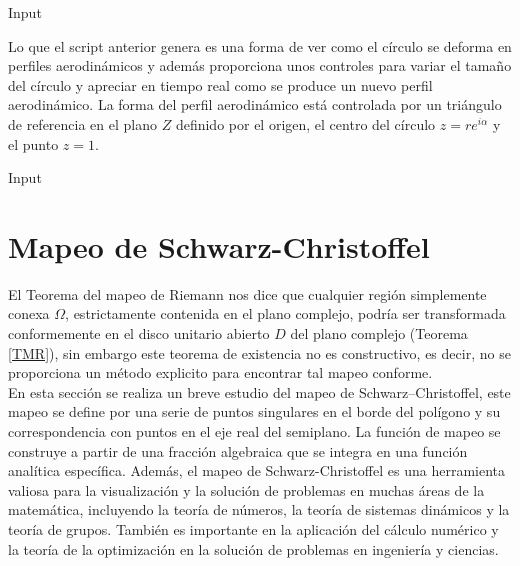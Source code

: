 \begin{mmaCell}[moregraphics={moreig={scale=0.6}}]{Input}
\end{mmaCell}


Lo  que el script anterior genera es una forma de ver como el círculo se deforma en perfiles aerodinámicos y además proporciona unos controles para variar el tamaño del círculo y apreciar en tiempo real como se produce un nuevo perfil aerodinámico. La forma del perfil aerodinámico está controlada por un triángulo de referencia en el plano $Z$ definido por el origen, el centro del círculo  $z=re^{i\alpha}$ y el punto $z=1$.
\begin{mmaCell}[moregraphics={moreig={scale=0.6}}]{Input}
\end{mmaCell}




\section{Mapeo de Schwarz-Christoffel}
El Teorema del mapeo de Riemann nos dice que cualquier región simplemente conexa $\Omega$, estrictamente contenida en el plano complejo, podría ser transformada conformemente en el disco unitario abierto $D$ del plano complejo (Teorema \ref{TMR}), sin embargo este teorema de existencia no es constructivo, es decir, no se proporciona un método explicito para encontrar tal mapeo conforme.\\
En esta sección se realiza un breve estudio del mapeo de Schwarz–Christoffel, este mapeo se define por una serie de puntos singulares en el borde del polígono y su correspondencia con puntos en el eje real del semiplano. La función de mapeo se construye a partir de una fracción algebraica que se integra en una función analítica específica. Además, el mapeo de Schwarz-Christoffel es una herramienta valiosa para la visualización y la solución de problemas en muchas áreas de la matemática, incluyendo la teoría de números, la teoría de sistemas dinámicos y la teoría de grupos. También es importante en la aplicación del cálculo numérico y la teoría de la optimización en la solución de problemas en ingeniería y ciencias.\\

